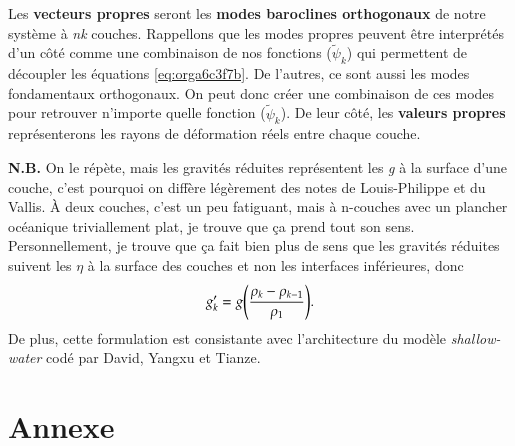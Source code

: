 \documentclass[10pt]{article}
\numberwithin{equation}{section}
\newcommand{\tpsi}{\tilde{\psi}}
\begin{document}
Les \textbf{vecteurs propres} seront les \textbf{modes baroclines orthogonaux} de notre système à \emph{nk} couches.
Rappellons que les modes propres peuvent être interprétés d'un côté comme une combinaison de nos fonctions (\(\tpsi_k\)) qui permettent de découpler les équations \ref{eq:orga6c3f7b}.
De l'autres, ce sont aussi les modes fondamentaux orthogonaux.
On peut donc créer une combinaison de ces modes pour retrouver n'importe quelle fonction (\(\tpsi_k\)).
De leur côté, les \textbf{valeurs propres} représenterons les rayons de déformation réels entre chaque couche.\bigskip



\textbf{N.B.} On le répète, mais les gravités réduites représentent les \emph{g} à la surface d'une couche, c'est pourquoi on diffère légèrement des notes de Louis-Philippe et du Vallis.
À deux couches, c'est un peu fatiguant, mais à n-couches avec un plancher océanique triviallement plat, je trouve que ça prend tout son sens.
Personnellement, je trouve que ça fait bien plus de sens que les gravités réduites suivent les \(\eta\) à la surface des couches et non les interfaces inférieures, donc
\begin{equation}
g_k' = g \qty(\frac{\rho_k - \rho_{k-1}}{\rho_1}).
\end{equation}
De plus, cette formulation est consistante avec l'architecture du modèle \emph{shallow-water} codé par David, Yangxu et Tianze.





\section{Annexe}
\label{sec:org49943b3}
\end{document}
